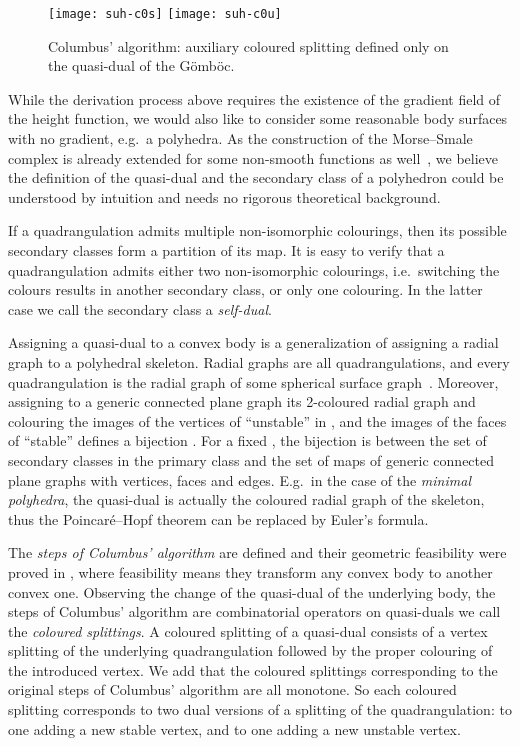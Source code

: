 \documentclass[]{article}
\newcommand{\Gomboc}{Gömböc\xspace}
\begin{document}
\begin{figure}
  \centering
\texttt{[image: suh-c0s]}
  \qquad
  \texttt{[image: suh-c0u]}
  \caption{Columbus' algorithm: auxiliary coloured splitting  defined only on the quasi-dual  of the \Gomboc.}
  \label{fig:gomboc}
\end{figure}

While the derivation process above requires the existence of the gradient field of the height function, we would also like to consider some reasonable body surfaces with no gradient, e.g.\  a polyhedra.
As the construction of the Morse--Smale complex is already extended for some non-smooth functions as well~\cite{Edelsbrunner2001}, we believe the definition of the quasi-dual and the secondary class of a polyhedron could be understood by intuition and needs no rigorous theoretical background.

If a quadrangulation admits multiple non-isomorphic colourings, then its possible secondary classes form a partition of its map. It is easy to verify that a quadrangulation admits either two non-isomorphic colourings, i.e.\  switching the colours results in another secondary class, or only one colouring.
In the latter case we call the secondary class a \emph{self-dual}.

Assigning a quasi-dual to a convex body is a generalization of assigning a radial graph to a polyhedral skeleton.
Radial graphs are all quadrangulations, and every quadrangulation is the radial graph of some spherical surface graph~\cite{Mohar2001, Brinkmann2005}.
Moreover, assigning to a generic connected plane graph  its 2-coloured radial graph  and colouring the images of the vertices of  ``unstable'' in , and the images of the faces of  ``stable'' defines a bijection \cite{Fusy2007}.
For a fixed , the bijection is between the set of secondary classes in the primary class  and the set of maps of generic connected plane graphs with  vertices,  faces and  edges.
E.g.\  in the case of the \emph{minimal polyhedra}, the quasi-dual is actually the coloured radial graph of the skeleton, thus the Poincaré--Hopf theorem can be replaced by Euler's formula.

The \emph{steps of Columbus' algorithm} are defined and their geometric feasibility were proved in \cite{Domokos2006}, where feasibility means they transform any convex body to another convex one.
Observing the change of the quasi-dual of the underlying body, the steps of Columbus' algorithm are combinatorial operators on quasi-duals we call the \emph{coloured splittings}.
A coloured splitting of a quasi-dual consists of a vertex splitting of the underlying quadrangulation followed by the proper colouring of the introduced vertex.
We add that the coloured splittings corresponding to the original steps of Columbus' algorithm are all monotone.
So each coloured splitting corresponds to two dual versions of a splitting of the quadrangulation: to one adding a new stable vertex, and to one adding a new unstable vertex.
\end{document}
